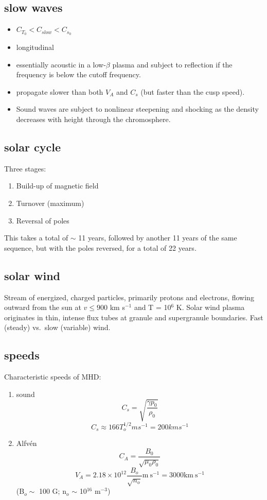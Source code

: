 \documentclass{article}
\begin{document}
\subsection{slow waves}
\begin{itemize}
    \item $C_{T_0} < C_{slow} < C_{s_0}$
    \item longitudinal
    \item essentially acoustic in a low-$\beta$ plasma and subject to
        reflection if the frequency is below the cutoff frequency.
    \item propagate slower than both $V_{A}$ and $C_{s}$ (but faster than
        the cusp speed).
    \item Sound waves are subject to nonlinear steepening and shocking
        as the density decreases with height through the chromosphere.
\end{itemize}

\subsection{solar cycle}
Three stages:
\begin{enumerate}
    \item Build-up of magnetic field
    \item Turnover (maximum)
    \item Reversal of poles
\end{enumerate}
This takes a total of $\sim$ 11 years, followed by another 11 years of the same
sequence, but with the poles reversed, for a total of 22 years.

\subsection{solar wind}
Stream of energized, charged particles, primarily protons and electrons,
flowing outward from the sun at $v \leq 900$ km s$^{-1}$ and T = 10$^6$ K.
Solar wind plasma originates in thin, intense flux tubes at granule
and supergranule boundaries. Fast (steady) vs.\ slow (variable) wind.

\subsection{speeds}
Characteristic speeds of MHD:
\begin{enumerate}
    \item sound
        \[
            C_{s} = \sqrt{\frac{\gamma p_{0}}{\rho_{0}}} 
            \]
        \[
            C_{s} \approx 166 T_{o}^{1/2} m s^{-1} = 200 km s^{-1}
            \]
    \item Alfv\'en
        \[
            C_{A} = \frac{B_{0}}{\sqrt{\mu_{0}\rho_{0}}} 
            \]
        \[
            V_{A} = 2.18\times10^{12}\frac{B_o}{\sqrt{n_o}}
        \textrm{m}\ \textrm{s}^{-1}
               = 3000 \textrm{km}\ \textrm{s}^{-1}
            \]
               (B$_{o} \sim$ 100 G; n$_{o}$ $\sim$ 10$^{16}$ m$^{-3}$)
\end{enumerate}
\end{document}
